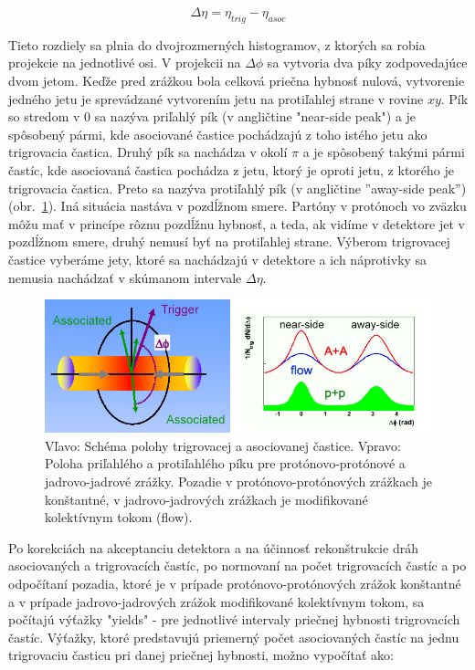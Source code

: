 \documentclass[thesismargins, thesislinespacing]{rnthesis}
\begin{document}
\begin{equation}
\Delta \eta = \eta_{trig} - \eta_{asoc}
\end{equation}

Tieto rozdiely sa plnia do dvojrozmerných histogramov, z ktorých sa robia projekcie na jednotlivé osi. V projekcii na $\Delta \phi$ sa vytvoria dva píky zodpovedajúce dvom jetom. Keďže pred zrážkou bola celková priečna hybnosť nulová, vytvorenie jedného jetu je sprevádzané vytvorením jetu na protiľahlej strane v rovine $xy$. Pík  so stredom v 0 sa nazýva priľahlý pík (v angličtine "near-side peak") a je spôsobený pármi, kde asociované častice pochádzajú z toho istého jetu ako trigrovacia častica. Druhý pík sa nachádza v okolí $\pi$ a je spôsobený takými pármi častíc, kde asociovaná častica pochádza z jetu, ktorý je oproti jetu, z ktorého je trigrovacia častica. Preto sa nazýva protiľahlý pík (v angličtine ''away-side peak'')(obr.~\ref{kor}). Iná situácia nastáva v pozdĺžnom smere. Partóny v protónoch vo zväzku môžu mať v princípe rôznu pozdĺžnu hybnosť, a teda, ak vidíme v detektore jet v pozdĺžnom smere, druhý nemusí byť na protiľahlej strane. Výberom trigrovacej častice vyberáme jety, ktoré sa nachádzajú v detektore a ich náprotivky sa nemusia nachádzať v skúmanom intervale $\Delta \eta$.

\begin{figure}[hbtp!]
	\begin{center}
		\includegraphics[width=\textwidth]{./Obrazky_praca/dijetcorrelations.png}
		\caption{Vľavo: Schéma polohy trigrovacej a asociovanej častice. Vpravo: Poloha priľahlého a protiľahlého píku pre protónovo-protónové a jadrovo-jadrové zrážky. Pozadie v protónovo-protónových zrážkach je konštantné, v jadrovo-jadrových zrážkach je \-mo\-di\-fi\-ko\-va\-né kolektívnym tokom (flow).}
		\label{kor}
	\end{center}
\end{figure}

Po korekciách na akceptanciu detektora a na účinnosť rekonštrukcie dráh asociovaných a trigrovacích častíc, po normovaní na počet trigrovacích častíc a po odpočítaní pozadia, ktoré je v prípade protónovo-protónových zrážok konštantné a v prípade jadrovo-jadrových zrážok modifikované kolektívnym tokom, sa počítajú výťažky \-"yields" \- - pre jednotlivé intervaly priečnej hybnosti trigrovacích častíc. Výťažky, ktoré predstavujú priemerný počet asociovaných častíc na jednu trigrovaciu časticu pri danej priečnej hybnosti, možno vypočítať ako:
\end{document}
